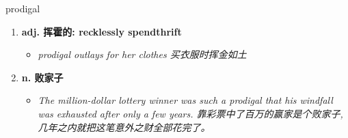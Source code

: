 
\begin{frame}
{\huge prodigal}
\begin{center}
\begin{enumerate}\Large
  \item \textbf{adj. 挥霍的: recklessly spendthrift}
  \begin{itemize}
    \item \em{\Large{prodigal outlays for her clothes 买衣服时挥金如土}}
  \end{itemize}
  \item \textbf{n. 败家子}
  \begin{itemize}
    \item \em{\Large{The million-dollar lottery winner was such a prodigal that his windfall was exhausted after only a few years. 靠彩票中了百万的赢家是个败家子,几年之内就把这笔意外之财全部花完了。}}
  \end{itemize}
\end{enumerate}
\end{center}
\end{frame}

